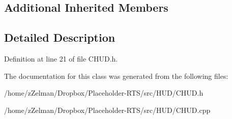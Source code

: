 \subsection*{Additional Inherited Members}


\subsection{Detailed Description}


Definition at line 21 of file C\-H\-U\-D.\-h.



The documentation for this class was generated from the following files\-:\begin{DoxyCompactItemize}
\item 
/home/z\-Zelman/\-Dropbox/\-Placeholder-\/\-R\-T\-S/src/\-H\-U\-D/C\-H\-U\-D.\-h\item 
/home/z\-Zelman/\-Dropbox/\-Placeholder-\/\-R\-T\-S/src/\-H\-U\-D/C\-H\-U\-D.\-cpp\end{DoxyCompactItemize}
